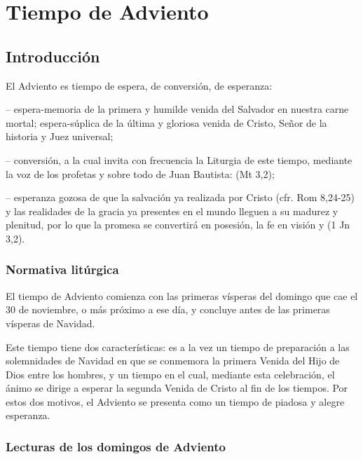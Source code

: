 \part{Tiempo de Adviento}

\chapter{Introducción}

\begin{introstyle}
	
	El Adviento es tiempo de espera, de conversión, de esperanza\label{fn2}:
	
	-- espera-memoria de la primera y humilde venida del Salvador en nuestra carne mortal; espera-súplica de la última y gloriosa venida de Cristo, Señor de la historia y Juez universal;
	
	-- conversión, a la cual invita con frecuencia la Liturgia de este tiempo, mediante la voz de los profetas y sobre todo de Juan Bautista:	 (Mt 3,2);
	
	-- esperanza gozosa de que la salvación ya realizada por Cristo (cfr. Rom 8,24-25) y las realidades de la gracia ya presentes en el mundo lleguen a su madurez y plenitud, por lo que la promesa se convertirá en	posesión, la fe en visión y  (1 Jn 3,2).
	
	\section{Normativa litúrgica}
	El tiempo de Adviento comienza con las primeras vísperas del domingo que cae el 30 de noviembre, o más próximo a ese día, y concluye antes de las primeras vísperas de Navidad.\label{fn3}
	
	Este tiempo tiene dos características: es a la vez un tiempo de preparación a las solemnidades de Navidad en que se conmemora la primera Venida del Hijo de Dios entre los hombres, y un tiempo en el cual, mediante esta celebración, el ánimo se dirige a esperar la segunda Venida de Cristo al fin de los tiempos. Por estos dos motivos, el Adviento se presenta como un tiempo de piadosa y alegre esperanza.
	
	\section{Lecturas de los domingos de Adviento}
	

\end{introstyle}
